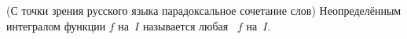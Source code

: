 
  (С точки зрения русского языка парадоксальное сочетание слов) Неопределённым интегралом функции $f$ на~$I$ называется любая \op\ $f$ на~$I$.
